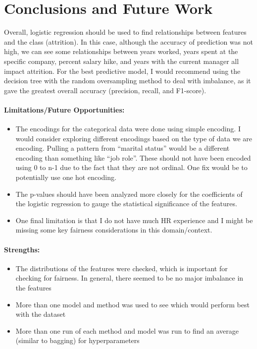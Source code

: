 \documentclass{article}
\begin{document}
\section{Conclusions and Future Work}
\vspace{-2mm} 
Overall, logistic regression should be used to find relationships between features and the class (attrition). In this case, although the accuracy of prediction was not high, we can see some relationships between years worked, years spent at the specific company,  percent salary hike, and years with the current manager all impact attrition. For the best predictive model, I would recommend using the decision tree with the random oversampling method to deal with imbalance, as it gave the greatest overall accuracy (precision, recall, and F1-score). 

\paragraph{Limitations/Future Opportunities:}

\begin{itemize}[leftmargin=0.5cm]
\vspace{-1mm} 
    \item The encodings for the categorical data were done using simple encoding. I would consider exploring different encodings based on the type of data we are encoding. Pulling a pattern from “marital status” would be a different encoding than something like “job role”. These should not have been encoded using 0 to n-1 due to the fact that they are not ordinal. One fix would be to potentially use one hot encoding. 
    \item The p-values should have been analyzed more closely for the coefficients of the logistic regression to gauge the statistical significance of the features.
    \item One final limitation is that I do not have much HR experience and I might be missing some key fairness considerations in this domain/context.
\end{itemize}

\paragraph{Strengths:} 
\begin{itemize}[leftmargin=0.5cm]
\vspace{-1mm} 
    \item The distributions of the features were checked, which is important for checking for fairness. In general, there seemed to be no major imbalance in the features
    \item More than one model and method was used to see which would perform best with the dataset
    \item More than one run of each method and model was run to find an average (similar to bagging) for hyperparameters
\end{itemize}
\end{document}

